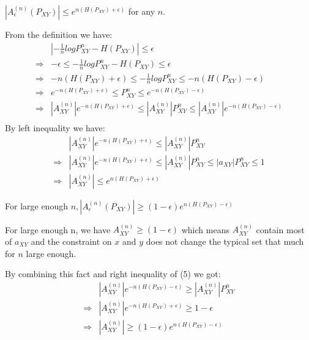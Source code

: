 \documentclass[
  course = {{EE623 Information Theory}},
  quartile = {{4}},
  assignment = 7,
  name = {{Mohammad Mahdi Rahimi}},
  studentnumber = {{20208244}},
  email = {{mahi@kaist.ac.kr}},
  firstexercise = 1
]{aga-homework}
\begin{document}
\newpage

\subexercise $\left| A^{(n)}_\epsilon(P_{XY})\right| \le e^{n(H(P_{XY})+\epsilon)}$ for any $n$.

From the definition we have:
\begin{equation} \label{eq5}
\begin{split}
&\left|-\frac{1}{n}logP^n_{XY} - H(P_{XY})\right| \le \epsilon\\
\Rightarrow & -\epsilon \le -\frac{1}{n}logP^n_{XY} - H(P_{XY}) \le \epsilon\\
\Rightarrow & -n(H(P_{XY}) + \epsilon) \le -\frac{1}{n}logP^n_{XY} \le -n(H(P_{XY}) - \epsilon)\\
\Rightarrow & e^{-n(H(P_{XY}) + \epsilon)} \le P^n_{XY} \le e^{-n(H(P_{XY}) - \epsilon)}\\
\Rightarrow & |A^{(n)}_{XY}|e^{-n(H(P_{XY}) + \epsilon)} \le |A^{(n)}_{XY}|P^n_{XY} \le |A^{(n)}_{XY}|e^{-n(H(P_{XY}) - \epsilon)}\\
\end{split}
\end{equation}
By left inequality we have:
\begin{equation} \label{eq6}
\begin{split}
&|A^{(n)}_{XY}|e^{-n(H(P_{XY}) + \epsilon)} \le |A^{(n)}_{XY}|P^n_{XY}\\
\Rightarrow & |A^{(n)}_{XY}|e^{-n(H(P_{XY}) + \epsilon)} \le |A^{(n)}_{XY}|P^n_{XY} \le |a_{XY}|P^n_{XY} \le 1 \\
\Rightarrow & |A^{(n)}_{XY}| \le e^{n(H(P_{XY}) + \epsilon)}
\end{split}
\end{equation}


\subexercise For large enough $n, \left| A^{(n)}_\epsilon(P_{XY})\right| \ge (1-\epsilon)e^{n(H(P_{XY})-\epsilon)}$

For large enough n, we have $A^{(n)}_{XY} \ge (1 - \epsilon)$ which means $A^{(n)}_{XY}$ contain most of $a_{XY}$ and the constraint on $x$ and $y$ does not change the typical set that much for $n$ large enough.

By combining this fact and right inequality of (5) we got:
\begin{equation} \label{eq7}
\begin{split}
&|A^{(n)}_{XY}|e^{-n(H(P_{XY}) - \epsilon)} \ge |A^{(n)}_{XY}|P^n_{XY}\\
\Rightarrow & |A^{(n)}_{XY}|e^{-n(H(P_{XY}) + \epsilon)} \ge 1 - \epsilon\\
\Rightarrow & |A^{(n)}_{XY}| \ge (1-\epsilon)e^{n(H(P_{XY}) - \epsilon)}
\end{split}
\end{equation}
\end{document}
